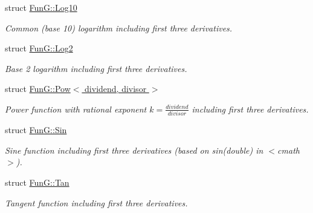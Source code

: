 \begin{DoxyCompactItemize}
struct \hyperlink{structFunG_1_1Log10}{Fun\+G\+::\+Log10}
\begin{DoxyCompactList}\small\item\em Common (base 10) logarithm including first three derivatives. \end{DoxyCompactList}\item 
struct \hyperlink{structFunG_1_1Log2}{Fun\+G\+::\+Log2}
\begin{DoxyCompactList}\small\item\em Base 2 logarithm including first three derivatives. \end{DoxyCompactList}\item 
struct \hyperlink{structFunG_1_1Pow}{Fun\+G\+::\+Pow$<$ dividend, divisor $>$}
\begin{DoxyCompactList}\small\item\em Power function with rational exponent $ k = \frac{dividend}{divisor} $ including first three derivatives. \end{DoxyCompactList}\item 
struct \hyperlink{structFunG_1_1Sin}{Fun\+G\+::\+Sin}
\begin{DoxyCompactList}\small\item\em Sine function including first three derivatives (based on sin(double) in $<$cmath$>$). \end{DoxyCompactList}\item 
struct \hyperlink{structFunG_1_1Tan}{Fun\+G\+::\+Tan}
\begin{DoxyCompactList}\small\item\em Tangent function including first three derivatives. \end{DoxyCompactList}\end{DoxyCompactItemize}
